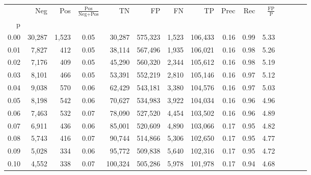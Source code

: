 \begin{tabular}{rrrcrrrrrrrrrrr}
\toprule
{} &     Neg &    Pos & $\frac{\text{Pos}}{\text{Neg}+\text{Pos}}$ &       TN &       FP &       FN &       TP &  Prec &   Rec & $\frac{\text{FP}}{\text{P}}$ \\
p    &         &        &                                            &          &          &          &          &       &       &                              \\
\midrule
0.00 &  30,287 &  1,523 &                                       0.05 &   30,287 &  575,323 &    1,523 &  106,433 &  0.16 &  0.99 &                         5.33 \\
0.01 &   7,827 &    412 &                                       0.05 &   38,114 &  567,496 &    1,935 &  106,021 &  0.16 &  0.98 &                         5.26 \\
0.02 &   7,176 &    409 &                                       0.05 &   45,290 &  560,320 &    2,344 &  105,612 &  0.16 &  0.98 &                         5.19 \\
0.03 &   8,101 &    466 &                                       0.05 &   53,391 &  552,219 &    2,810 &  105,146 &  0.16 &  0.97 &                         5.12 \\
0.04 &   9,038 &    570 &                                       0.06 &   62,429 &  543,181 &    3,380 &  104,576 &  0.16 &  0.97 &                         5.03 \\
0.05 &   8,198 &    542 &                                       0.06 &   70,627 &  534,983 &    3,922 &  104,034 &  0.16 &  0.96 &                         4.96 \\
0.06 &   7,463 &    532 &                                       0.07 &   78,090 &  527,520 &    4,454 &  103,502 &  0.16 &  0.96 &                         4.89 \\
0.07 &   6,911 &    436 &                                       0.06 &   85,001 &  520,609 &    4,890 &  103,066 &  0.17 &  0.95 &                         4.82 \\
0.08 &   5,743 &    416 &                                       0.07 &   90,744 &  514,866 &    5,306 &  102,650 &  0.17 &  0.95 &                         4.77 \\
0.09 &   5,028 &    334 &                                       0.06 &   95,772 &  509,838 &    5,640 &  102,316 &  0.17 &  0.95 &                         4.72 \\
0.10 &   4,552 &    338 &                                       0.07 &  100,324 &  505,286 &    5,978 &  101,978 &  0.17 &  0.94 &                         4.68 \\

\end{tabular}
